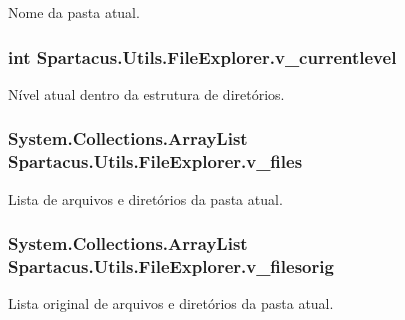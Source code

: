 Nome da pasta atual. 

\hypertarget{classSpartacus_1_1Utils_1_1FileExplorer_a3622a3fd986d0685ce13c5fe0ebb2c3b}{
\subsubsection[{v\+\_\+currentlevel}]{\setlength{\rightskip}{0pt plus 5cm}int Spartacus.\+Utils.\+File\+Explorer.\+v\+\_\+currentlevel}}\label{classSpartacus_1_1Utils_1_1FileExplorer_a3622a3fd986d0685ce13c5fe0ebb2c3b}


Nível atual dentro da estrutura de diretórios. 

\hypertarget{classSpartacus_1_1Utils_1_1FileExplorer_a94c423e8e9df914fb225b740e4829b11}{
\subsubsection[{v\+\_\+files}]{\setlength{\rightskip}{0pt plus 5cm}System.\+Collections.\+Array\+List Spartacus.\+Utils.\+File\+Explorer.\+v\+\_\+files}}\label{classSpartacus_1_1Utils_1_1FileExplorer_a94c423e8e9df914fb225b740e4829b11}


Lista de arquivos e diretórios da pasta atual. 

\hypertarget{classSpartacus_1_1Utils_1_1FileExplorer_adb13bc5f2309ceb21861d1a84caf7f98}{
\subsubsection[{v\+\_\+filesorig}]{\setlength{\rightskip}{0pt plus 5cm}System.\+Collections.\+Array\+List Spartacus.\+Utils.\+File\+Explorer.\+v\+\_\+filesorig}}\label{classSpartacus_1_1Utils_1_1FileExplorer_adb13bc5f2309ceb21861d1a84caf7f98}


Lista original de arquivos e diretórios da pasta atual. 

